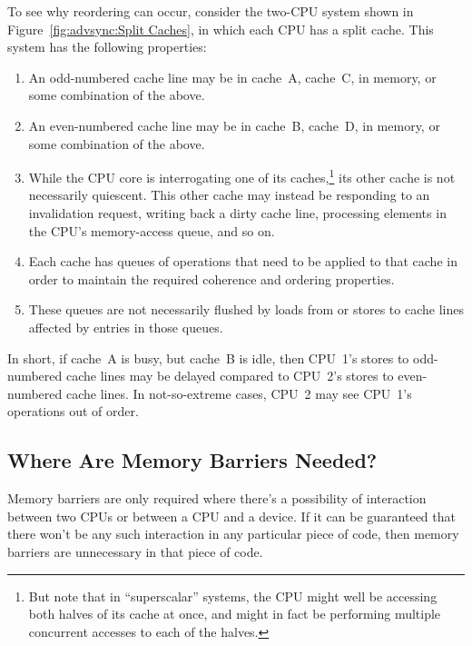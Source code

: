 To see why reordering can occur, consider the two-CPU system shown in
Figure~\ref{fig:advsync:Split Caches}, in which each CPU has a split
cache.
This system has the following properties:
\begin{enumerate}
\item	An odd-numbered cache line may be in cache~A, cache~C,
	in memory, or some combination of the above.
\item	An even-numbered cache line may be in cache~B, cache~D,
	in memory, or some combination of the above.
\item	While the CPU core is interrogating one of its caches,\footnote{
		But note that in ``superscalar'' systems, the CPU
		might well be accessing both halves of its cache at
		once, and might in fact be performing multiple concurrent
		accesses to each of the halves.}
	its other cache is not necessarily quiescent.
	This other cache may instead be responding to an invalidation
	request, writing back a dirty cache line,
	processing elements in the CPU's memory-access queue, and
	so on.
\item	Each cache has queues of operations that need to be applied
	to that cache in order to maintain the required coherence
	and ordering properties.
\item	These queues are not necessarily flushed by loads from or
	stores to cache lines affected by entries in those queues.
\end{enumerate}

In short, if cache~A is busy, but cache~B is idle, then CPU~1's
stores to odd-numbered cache lines may be delayed compared to
CPU~2's stores to even-numbered cache lines.
In not-so-extreme cases, CPU~2 may see CPU~1's operations out
of order.

	 {}

\subsection{Where Are Memory Barriers Needed?}
\label{sec:advsync:Where Are Memory Barriers Needed?}

Memory barriers are only required where there's a possibility of interaction
between two CPUs or between a CPU and a device.  If it can be guaranteed that
there won't be any such interaction in any particular piece of code, then
memory barriers are unnecessary in that piece of code.

